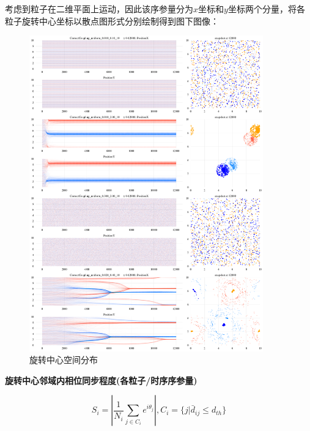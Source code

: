 \documentclass{article}
\begin{document}
考虑到粒子在二维平面上运动，因此该序参量分为$x$坐标和$y$坐标两个分量，将各粒子旋转中心坐标以散点图形式分别绘制得到图下图像：

\begin{figure}[H]
	\centering
	\includegraphics[width=0.9\textwidth]{./figs/totalXY.png}
	\caption{旋转中心空间分布}
	\label{fig:fig234t.1}
\end{figure}

\newpage
\noindent\textbf{旋转中心邻域内相位同步程度(各粒子/时序序参量)}

$$S_{i}=\left|\frac{1}{N_{i}}\sum_{j\in C_{i}}e^{i\theta_{j}}\right|,C_{i}=\{j|\bar{d}_{ij}\leq d_{th}\}$$
\end{document}
